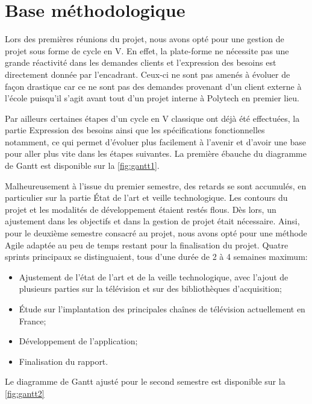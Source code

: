 \documentclass{polytech/polytech}
\begin{document}
\section{Base méthodologique}


Lors des premières réunions du projet, nous avons opté pour une gestion de projet sous forme de cycle en V. En effet, la plate-forme ne nécessite pas une grande réactivité dans les demandes clients et l'expression des besoins est directement donnée par l'encadrant. Ceux-ci ne sont pas amenés à évoluer de façon drastique car ce ne sont pas des demandes provenant d'un client externe à l'école puisqu'il s'agit avant tout d'un projet interne à Polytech en premier lieu. 

Par ailleurs certaines étapes d'un cycle en V classique ont déjà été effectuées, la partie Expression des besoins ainsi que les spécifications fonctionnelles notamment, ce qui permet d'évoluer plus facilement à l'avenir et d'avoir une base pour aller plus vite dans les étapes suivantes. La première ébauche du diagramme de Gantt est disponible sur la \autoref{fig:gantt1}.

Malheureusement à l'issue du premier semestre, des retards se sont accumulés, en particulier sur la partie \'{E}tat de l'art et veille technologique. Les contours du projet et les modalités de développement étaient restés flous. Dès lors, un ajustement dans les objectifs et dans la gestion de projet était nécessaire. Ainsi, pour le deuxième semestre consacré au projet, nous avons opté pour une méthode Agile adaptée au peu de temps restant pour la finalisation du projet. Quatre sprints principaux se distinguaient, tous d'une durée de 2 à 4 semaines maximum:

\begin{itemize}
	\item Ajustement de l'état de l'art et de la veille technologique, avec l'ajout de plusieurs parties sur la télévision et sur des bibliothèques d'acquisition;
	\item \'{E}tude sur l'implantation des principales chaînes de télévision actuellement en France;
	\item Développement de l'application;
	\item Finalisation du rapport.
\end{itemize}

Le diagramme de Gantt ajusté pour le second semestre est disponible sur la \autoref{fig:gantt2}
\end{document}
